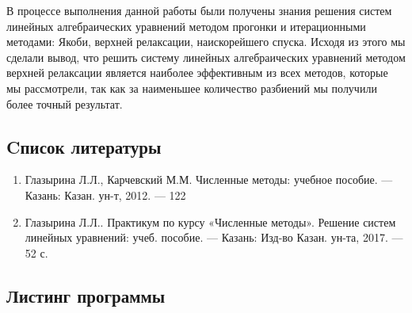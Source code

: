 \documentclass[a4paper,12pt]{article}
\begin{document}
В процессе выполнения данной работы были получены знания решения систем 
линейных алгебраических уравнений методом прогонки и итерационными методами: 
Якоби, верхней релаксации, наискорейшего спуска. Исходя из этого мы сделали вывод, 
что решить систему линейных алгебраических уравнений методом верхней релаксации является наиболее эффективным
из всех методов, которые мы рассмотрели, так как за наименьшее количество разбиений мы получили более точный результат.
\newpage

\begin{center}
\section{Cписок литературы}
\end{center}
\begin{enumerate}
    \item Глазырина Л.Л., Карчевский М.М. Численные методы: учебное пособие. — Казань: Казан.
    ун-т, 2012. — 122 
    \item Глазырина Л.Л.. Практикум по курсу «Численные методы». Решение
    систем линейных уравнений: учеб. пособие. — Казань: Изд-во Казан. ун-та, 2017. — 52 с.
\end{enumerate}
\newpage

\begin{center}
\section{Листинг программы}
\end{center}

\end{document}
